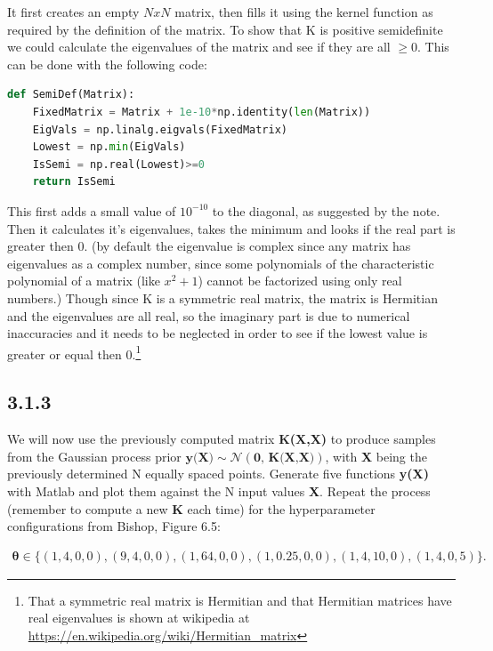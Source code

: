 \documentclass[a4paper]{article}
\begin{document}
It first creates an empty $N x N$ matrix, then fills it using the kernel function as required by the definition of the matrix. To show that K is positive semidefinite we could calculate the eigenvalues of the matrix and see if they are all $\geq 0$. This can be done with the following code:

\begin{lstlisting}[language=Python]
def SemiDef(Matrix):
    FixedMatrix = Matrix + 1e-10*np.identity(len(Matrix))
    EigVals = np.linalg.eigvals(FixedMatrix)
    Lowest = np.min(EigVals)
    IsSemi = np.real(Lowest)>=0
    return IsSemi
\end{lstlisting}

This first adds a small value of $10^{-10}$ to the diagonal, as suggested by the note. Then it calculates it's eigenvalues, takes the minimum and looks if the real part is greater then 0. (by default the eigenvalue is complex since any matrix has eigenvalues as a complex number, since some polynomials of the characteristic polynomial of a matrix (like $x^2+1$) cannot be factorized using only real numbers.) Though since K is a symmetric real matrix, the matrix is Hermitian and the eigenvalues are all real, so the imaginary part is due to numerical inaccuracies and it needs to be neglected in order to see if the lowest value is greater or equal then 0.\footnote{That a symmetric real matrix is Hermitian and that Hermitian matrices have real eigenvalues is shown at wikipedia at \url{https://en.wikipedia.org/wiki/Hermitian_matrix}}




\subsection*{3.1.3}

We  will now use the previously computed matrix \textbf{K(X,X)} to produce samples from the Gaussian process prior $\textbf{y(X)} \sim  \mathcal{N}(\textbf{0, K(X,X)})$, with \textbf{X} being the previously determined N equally spaced points. Generate five functions \textbf{y(X)} with Matlab and plot them against the N input values \textbf{X}. Repeat the process (remember to compute a new \textbf{K} each time) for the hyperparameter configurations from Bishop, Figure 6.5:

\begin{align*}
\boldsymbol{\theta} \in \{(1,4,0,0),(9,4,0,0),(1,64,0,0),(1,0.25,0,0),(1,4,10,0),(1,4,0,5)\}.
\end{align*}
\end{document}
